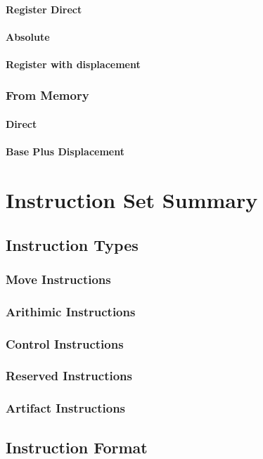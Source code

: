 \documentclass[oneside, a4paper]{memoir}
\begin{document}
\subsubsection{Register Direct}
\subsubsection{Absolute}
\subsubsection{Register with displacement}
\subsection{From Memory}
\subsubsection{Direct}
\subsubsection{Base Plus Displacement}

\chapter{Instruction Set Summary}
\section{Instruction Types}
\subsection{Move Instructions}
\subsection{Arithimic Instructions}
\subsection{Control Instructions}
\subsection{Reserved Instructions}
\subsection{Artifact Instructions}
\section{Instruction Format}
\end{document}
